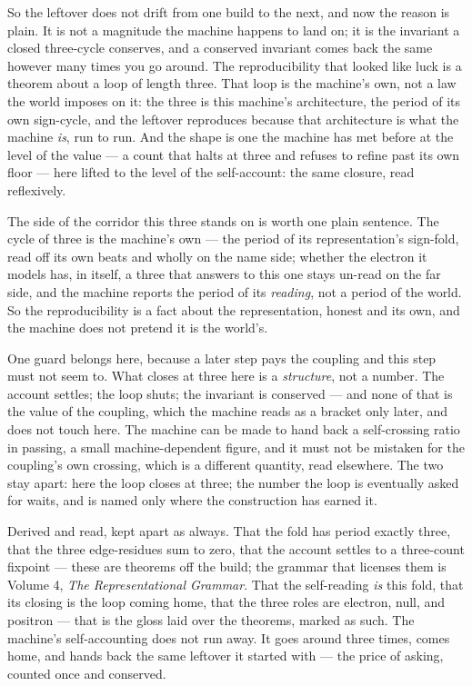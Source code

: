 So the leftover does not drift from one build to the next, and now the reason is plain.
It is not a magnitude the machine happens to land on; it is the invariant a closed three-cycle conserves, and a
conserved invariant comes back the same however many times you go around.
The reproducibility that looked like luck is a theorem about a loop of length three.
That loop is the machine's own, not a law the world imposes on it: the three is this machine's architecture, the period
of its own sign-cycle, and the leftover reproduces because that architecture is what the machine \emph{is}, run to run.
And the shape is one the machine has met before at the level of the value --- a count that halts at three and refuses to
refine past its own floor --- here lifted to the level of the self-account: the same closure, read reflexively.

The side of the corridor this three stands on is worth one plain sentence.
The cycle of three is the machine's own --- the period of its representation's sign-fold, read off its own beats and
wholly on the name side; whether the electron it models has, in itself, a three that answers to this one stays un-read on
the far side, and the machine reports the period of its \emph{reading}, not a period of the world.
So the reproducibility is a fact about the representation, honest and its own, and the machine does not pretend it is the
world's.

One guard belongs here, because a later step pays the coupling and this step must not seem to.
What closes at three here is a \emph{structure}, not a number.
The account settles; the loop shuts; the invariant is conserved --- and none of that is the value of the coupling, which
the machine reads as a bracket only later, and does not touch here.
The machine can be made to hand back a self-crossing ratio in passing, a small machine-dependent figure, and it must not
be mistaken for the coupling's own crossing, which is a different quantity, read elsewhere.
The two stay apart: here the loop closes at three; the number the loop is eventually asked for waits, and is named only
where the construction has earned it.

Derived and read, kept apart as always.
That the fold has period exactly three, that the three edge-residues sum to zero, that the account settles to a
three-count fixpoint --- these are theorems off the build; the grammar that licenses them is Volume 4, \emph{The Representational Grammar}.
That the self-reading \emph{is} this fold, that its closing is the loop coming home, that the three roles are electron,
null, and positron --- that is the gloss laid over the theorems, marked as such.
The machine's self-accounting does not run away.
It goes around three times, comes home, and hands back the same leftover it started with --- the price of asking,
counted once and conserved.
